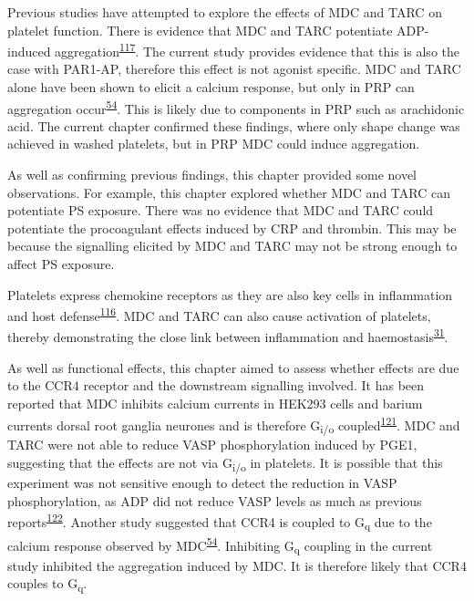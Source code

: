 \documentclass[11pt,twoside]{bristolthesis}
\begin{document}
Previous studies have attempted to explore the effects of MDC and TARC on platelet function. There is evidence that MDC and TARC potentiate ADP-induced aggregation\textsuperscript{\protect\hyperlink{ref-Gear2001}{117}}. The current study provides evidence that this is also the case with PAR1-AP, therefore this effect is not agonist specific. MDC and TARC alone have been shown to elicit a calcium response, but only in PRP can aggregation occur\textsuperscript{\protect\hyperlink{ref-Kowalska2000}{54}}. This is likely due to components in PRP such as arachidonic acid. The current chapter confirmed these findings, where only shape change was achieved in washed platelets, but in PRP MDC could induce aggregation.

As well as confirming previous findings, this chapter provided some novel observations. For example, this chapter explored whether MDC and TARC can potentiate PS exposure. There was no evidence that MDC and TARC could potentiate the procoagulant effects induced by CRP and thrombin. This may be because the signalling elicited by MDC and TARC may not be strong enough to affect PS exposure.

Platelets express chemokine receptors as they are also key cells in inflammation and host defense\textsuperscript{\protect\hyperlink{ref-Clemetson2000}{116}}. MDC and TARC can also cause activation of platelets, thereby demonstrating the close link between inflammation and haemostasis\textsuperscript{\protect\hyperlink{ref-Gear2003}{31}}.

As well as functional effects, this chapter aimed to assess whether effects are due to the CCR4 receptor and the downstream signalling involved. It has been reported that MDC inhibits calcium currents in HEK293 cells and barium currents dorsal root ganglia neurones and is therefore G\textsubscript{i/o} coupled\textsuperscript{\protect\hyperlink{ref-Oh2002}{121}}. MDC and TARC were not able to reduce VASP phosphorylation induced by PGE1, suggesting that the effects are not via G\textsubscript{i/o} in platelets. It is possible that this experiment was not sensitive enough to detect the reduction in VASP phosphorylation, as ADP did not reduce VASP levels as much as previous reports\textsuperscript{\protect\hyperlink{ref-Hezard2005}{122}}. Another study suggested that CCR4 is coupled to G\textsubscript{q} due to the calcium response observed by MDC\textsuperscript{\protect\hyperlink{ref-Kowalska2000}{54}}. Inhibiting G\textsubscript{q} coupling in the current study inhibited the aggregation induced by MDC. It is therefore likely that CCR4 couples to G\textsubscript{q}.
\end{document}
